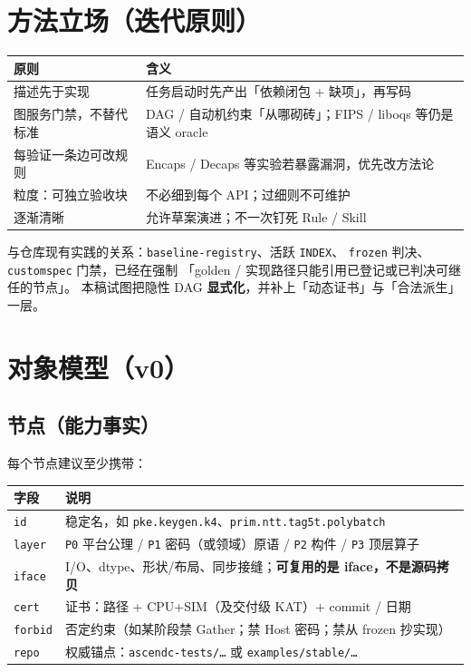 \documentclass[UTF8,a4paper,11pt]{ctexart}
\begin{document}
\section{方法立场（迭代原则）}

\begin{table}[h]
  \centering
  \begin{tabular}{@{}L{3.2cm}L{11cm}@{}}
    \toprule
    原则 & 含义 \\
    \midrule
    描述先于实现 & 任务启动时先产出「依赖闭包 + 缺项」，再写码 \\
    图服务门禁，不替代标准 & DAG / 自动机约束「从哪砌砖」；FIPS / liboqs 等仍是语义 oracle \\
    每验证一条边可改规则 & Encaps / Decaps 等实验若暴露漏洞，优先改方法论 \\
    粒度：可独立验收块 & 不必细到每个 API；过细则不可维护 \\
    逐渐清晰 & 允许草案演进；不一次钉死 Rule / Skill \\
    \bottomrule
  \end{tabular}
\end{table}

与仓库现有实践的关系：\texttt{baseline-registry}、活跃 \texttt{INDEX}、
\texttt{frozen} 判决、\texttt{customspec} 门禁，已经在强制
「golden / 实现路径只能引用已登记或已判决可继任的节点」。
本稿试图把隐性 DAG \textbf{显式化}，并补上「动态证书」与「合法派生」一层。

\section{对象模型（v0）}

\subsection{节点（能力事实）}
每个节点建议至少携带：

\begin{table}[h]
  \centering
  \begin{tabular}{@{}ll@{}}
    \toprule
    字段 & 说明 \\
    \midrule
    \texttt{id} & 稳定名，如 \texttt{pke.keygen.k4}、\texttt{prim.ntt.tag5t.polybatch} \\
    \texttt{layer} & \texttt{P0} 平台公理 / \texttt{P1} 密码（或领域）原语 / \texttt{P2} 构件 / \texttt{P3} 顶层算子 \\
    \texttt{iface} & I/O、dtype、形状/布局、同步接缝；\textbf{可复用的是 iface，不是源码拷贝} \\
    \texttt{cert} & 证书：路径 + CPU+SIM（及交付级 KAT）+ commit / 日期 \\
    \texttt{forbid} & 否定约束（如某阶段禁 Gather；禁 Host 密码；禁从 frozen 抄实现） \\
    \texttt{repo} & 权威锚点：\texttt{ascendc-tests/\ldots} 或 \texttt{examples/stable/\ldots} \\
    \bottomrule
  \end{tabular}
\end{table}
\end{document}
